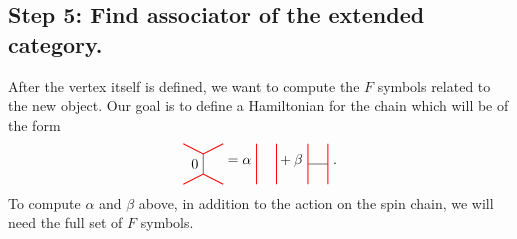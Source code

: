 \subsection*{Step 5: Find associator of the extended category.} After the vertex itself is defined, we want to compute the $F$ symbols related to the new object. 
Our goal is to define a Hamiltonian for the chain which will be of the form
	\begin{equation*}
		\begin{tikzpicture}[scale=1,baseline=(current bounding box.center)]
		\draw (.5,.25)--(.5,.75) node [pos=.5,left]{0};
		\draw [red, line width=0.25mm] (0,0) -- (.5,.25) -- (1,0);
		\draw [red, line width=0.25mm] (0,1) -- (.5,.75)--(1,1);
		\end{tikzpicture}
		=
		\alpha\ \begin{tikzpicture}[scale=1,baseline=(current bounding box.center)]
			\draw [red, line width=0.25mm] (0,0) -- (0,1);
			\draw [red, line width=0.25mm] (0.5,0) -- (0.5,1);
		\end{tikzpicture}
		+\beta\ \begin{tikzpicture}[scale=1,baseline=(current bounding box.center)]
			\draw (0,0.5) -- (0.5,0.5);
			\draw [red, line width=0.25mm] (0,0) -- (0,1);
			\draw [red, line width=0.25mm] (0.5,0) -- (0.5,1);			
		\end{tikzpicture}\ .
	\end{equation*}
To compute $\alpha$ and $\beta$ above, in addition to the action on the spin chain, we will need the full set of $F$ symbols.

